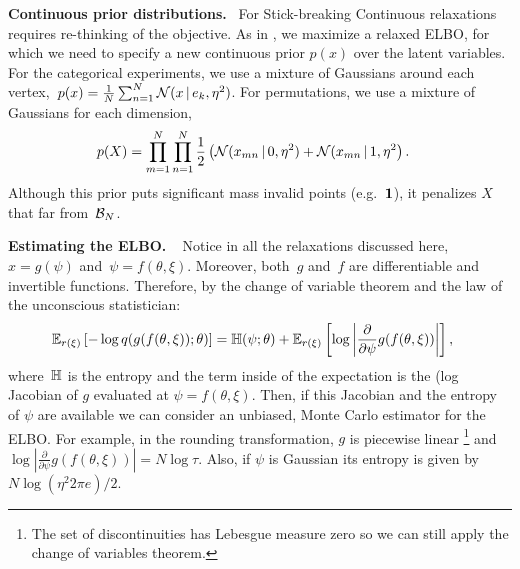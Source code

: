 \documentclass[twoside]{article}
\DeclareRobustCommand{\parhead}[1]{\textbf{#1}~}
\begin{document}
\parhead{Continuous prior distributions.} 
For Stick-breaking
Continuous relaxations requires
re-thinking of the objective. As in \cite{maddison2016concrete}, we
maximize a relaxed ELBO, for which we need to specify a new continuous
prior $p(x)$ over the latent variables.
For the categorical experiments, we use a mixture of Gaussians around
each vertex,~${p(x) = \tfrac{1}{N} \sum_{n=1}^N \mathcal{N}(x \, | \, e_k, \eta^2)}$. For permutations, we use a mixture of Gaussians for each
dimension,
\begin{align}
\label{eq:permprior}
  p(X) &= \prod_{m=1}^N \prod_{n=1}^N
  \frac{1}{2} \left(\mathcal{N}(x_{mn} \, | \, 0, \eta^2) + \mathcal{N}(x_{mn} \, | \, 1, \eta^2 \right).
  \end{align}
Although this prior puts significant mass invalid points
(e.g.~$\boldsymbol{1}$), it penalizes $X$ that far from~$\mathcal{B}_N$.

\parhead{Estimating the ELBO. } Notice in all the relaxations
discussed here,~${x = g(\psi)}$ and~${\psi = f(\theta,
  \xi)}$. Moreover, both~$g$ and~$f$ are differentiable and invertible
functions. Therefore, by the change of variable theorem and the law of
the unconscious statistician:
\begin{align}
  \mathbb{E}_{r(\xi)} \left[- \log q(g(f(\theta, \xi)); \theta) \right]
  &= \mathbb{H}(\psi; \theta)+
    \mathbb{E}_{r(\xi)}\left[\log \left|\frac{\partial}{\partial \psi} g(f(\theta, \xi)) \right| \right],
  \end{align}
where~$\mathbb{H}$ is the entropy and the term inside of the expectation
is the (log Jacobian of $g$ evaluated at $\psi =
f(\theta,\xi)$. Then, if this Jacobian and the entropy of $\psi$ are
available we can consider an unbiased, Monte Carlo estimator for the ELBO.
For example, in the rounding transformation, $g$ is piecewise linear
\footnote{The set of discontinuities has Lebesgue measure zero so we
  can still apply the change of variables theorem.} and
$\log | \tfrac{\partial}{\partial \psi} g(f(\theta, \xi)) |= N\log
\tau$. Also, if $\psi$ is Gaussian its entropy is given by
$N\log(\eta^2 2\pi e )/2$.
\end{document}
